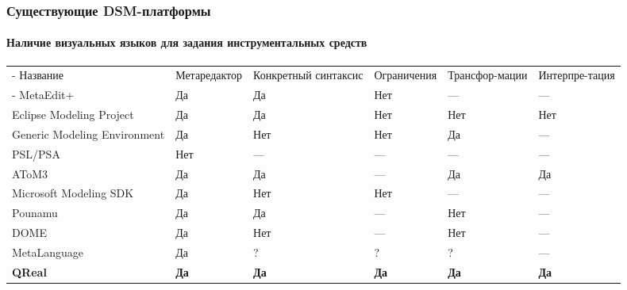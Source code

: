 \documentclass[14pt]{beamer}
\begin{document}
\begin{frame}
    \frametitle{Существующие DSM-платформы}
    \framesubtitle{Наличие визуальных языков для задания инструментальных средств}
    \begin{table}[ht]
    \begin{scriptsize}
        \tabulinesep=0.9mm
        \vspace*{-0.30cm}
    	\begin{tabu} {| X[1.2 l p] | X[1.2 c p] | X[1 c p] | X[1.1 c p] | X[1 c p] | X[1 c p] |}
    		\tabucline-
    		 Название                    & Метаредактор & Конкретный синтаксис & Ограничения & Трансфор-мации & Интерпре-тация \\
    		\tabucline-
    		\everyrow{\tabucline-}
    		MetaEdit+                    & Да           & Да                   & Нет         & ---           & ---           \\
    		Eclipse Modeling Project     & Да           & Да                   & Нет         & Нет           & Нет           \\
    		Generic Modeling Environment & Да           & Нет                  & Нет         & Да            & ---           \\
    		PSL/PSA                      & Нет          & ---                  & ---         & ---           & ---           \\
    		AToM3                        & Да           & Да                   & ---         & Да            & Да            \\
    		Microsoft Modeling SDK       & Да           & Нет                  & Нет         & ---           & ---           \\
    		Pounamu                      & Да           & Да                   & ---         & Нет           & ---           \\
    		DOME                         & Да           & Нет                  & ---         & Нет           & ---           \\
    		MetaLanguage                 & Да           & ?                    & ?           & ?             & ---           \\
    		\textbf{QReal}               & \textbf{Да}  & \textbf{Да}          & \textbf{Да} & \textbf{Да}   & \textbf{Да}
    		\label{tab:existingPlatformsCondensed}
    	\end{tabu}
    \end{scriptsize}
\end{table}\end{frame}
\end{document}

